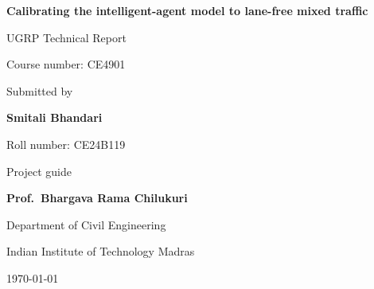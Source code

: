 \documentclass[11pt]{article}
\begin{document}
\begin{titlepage}
\centering
\vspace*{30mm}
{\LARGE\bfseries Calibrating the intelligent-agent model to lane-free mixed traffic\par}
\vspace{12mm}
{\large UGRP Technical Report\par}
\vspace{4mm}
{\large Course number: CE4901\par}
\vspace{25mm}
{\large Submitted by\par}
\vspace{2mm}
{\Large\bfseries Smitali Bhandari\par}
\vspace{1mm}
{\large Roll number: CE24B119\par}
\vspace{15mm}
{\large Project guide\par}
\vspace{2mm}
{\Large\bfseries Prof.\ Bhargava Rama Chilukuri\par}
\vfill
{\large Department of Civil Engineering\par}
{\large Indian Institute of Technology Madras\par}
\vspace{4mm}
{\large \today\par}
\end{titlepage}

\begin{abstract}
\noindent
Mixed traffic in India moves without lane discipline: vehicles of very
different sizes and abilities share the road and take any lateral position.
This report calibrates the intelligent-agent model (IAM), a two-dimensional
social-force extension of the intelligent driver model, to 781\,s of trajectory
data of vehicles in seven classes on a 204\,m road section. All vehicles
are simulated together from their measured entry states, with one parameter
vector per class, searched with CMA-ES, and an exit stop line taken from the
measured signal-like stops. Vehicles are split into training and held-out sets
within the same simulation. One-at-a-time sensitivity
profiles show that the fit is governed by the car-following parameters of the
largest classes, while the road-edge and lateral anisotropy parameters are
hardly constrained. The calibrated traffic forms queues at the right times and
places, but its lateral motion is a slow drift rather than the deliberate
sideways moves of real vehicles, which points to the missing lateral target in
the model equations.
\end{abstract}
\end{document}

